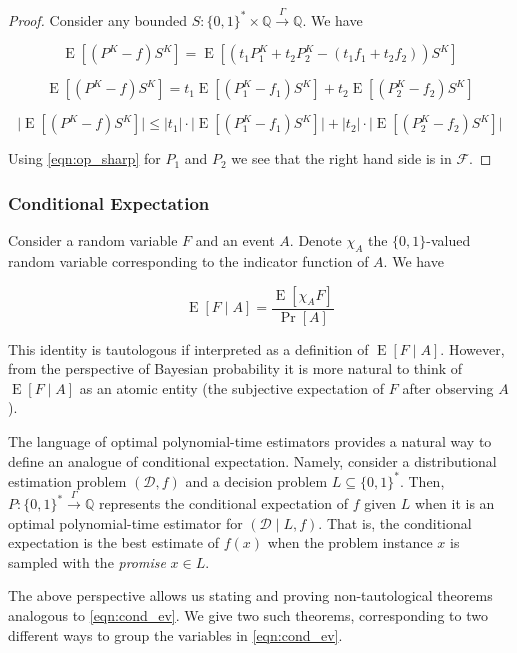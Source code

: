 \documentclass{article}
\numberwithin{equation}{section}
\theoremstyle{definition}
\theoremstyle{plain}
\newcommand{\Bool}{\{0,1\}}
\newcommand{\Words}{{\Bool^*}}
\DeclareMathOperator{\Prb}{Pr}
\DeclareMathOperator{\E}{E}
\newcommand{\Rats}{\mathbb{Q}}
\newcommand{\Abs}[1]{\lvert #1 \rvert}
\newcommand{\Dist}{\mathcal{D}}
\newcommand{\Fall}{\mathcal{F}}
\newcommand{\Scheme}{\xrightarrow{\Gamma}}
\begin{document}
\begin{proof}

Consider any bounded $S: \Words \times \Rats \Scheme \Rats$. We have

$$\E[(P^{K} - f)S^{K}] = \E[(t_1 P_1^{K} + t_2 P_2^{K} - (t_1 f_1 + t_2 f_2))S^{K}]$$

$$\E[(P^{K} - f)S^{K}] = t_1 \E[(P_1^{K} - f_1)S^{K}] + t_2 \E[(P_2^{K} - f_2)S^{K}]$$

$$\Abs{\E[(P^{K} - f)S^{K}]} \leq \Abs{t_1} \cdot \Abs{\E[(P_1^{K} - f_1)S^{K}]} + \Abs{t_2} \cdot \Abs{\E[(P_2^{K} - f_2)S^{K}]}$$

Using \ref{eqn:op_sharp} for $P_1$ and $P_2$ we see that the right hand side is in $\Fall$.
\end{proof}

\subsubsection{Conditional Expectation}

Consider a random variable $F$ and an event $A$. Denote $\chi_A$ the $\Bool$-valued random variable corresponding to the indicator function of $A$. We have

\begin{equation}
\label{eqn:cond_ev}
\E[F \mid A] = \frac{\E[\chi_A F]}{\Prb[A]}
\end{equation}

This identity is tautologous if interpreted as a definition of $\E[F \mid A]$. However, from the perspective of Bayesian probability it is more natural to think of $\E[F \mid A]$ as an atomic entity (the subjective expectation of $F$ after observing $A$). 

The language of optimal polynomial-time estimators provides a natural way to define an analogue of conditional expectation. Namely, consider a distributional estimation problem $(\Dist, f)$ and a decision problem ${L \subseteq \Words}$. Then, $P: \Words \Scheme \Rats$ represents the conditional expectation of $f$ given $L$ when it is an optimal polynomial-time estimator for $(\Dist \mid L, f)$. That is, the conditional expectation is the best estimate of $f(x)$ when the problem instance $x$ is sampled with the \emph{promise} $x \in L$.

The above perspective allows us stating and proving non-tautological theorems analogous to \ref{eqn:cond_ev}. We give two such theorems, corresponding to two different ways to group the variables in \ref{eqn:cond_ev}.
\end{document}
